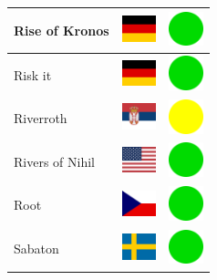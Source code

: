 \documentclass[12pt, a4paper, twoside]{report}
\begin{document}
\begin{center}
\begin{longtable}{|p{5cm}|p{2cm}|p{2cm}|}
Rise of Kronos & \includegraphics[width=1cm]{4x3/de} & \includegraphics[width=1cm]{likes/y} \\ \hline
Risk it & \includegraphics[width=1cm]{4x3/de} & \includegraphics[width=1cm]{likes/y} \\ \hline
Riverroth & \includegraphics[width=1cm]{4x3/rs} & \includegraphics[width=1cm]{likes/m} \\ \hline
Rivers of Nihil & \includegraphics[width=1cm]{4x3/us} & \includegraphics[width=1cm]{likes/y} \\ \hline
Root & \includegraphics[width=1cm]{4x3/cz} & \includegraphics[width=1cm]{likes/y} \\ \hline
Sabaton & \includegraphics[width=1cm]{4x3/se} & \includegraphics[width=1cm]{likes/y} \\ \hline

\end{longtable}
\end{center}
\end{document}
